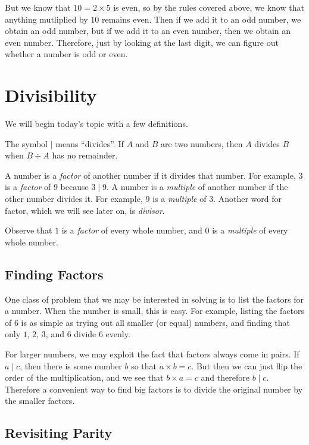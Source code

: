 \documentclass[a4paper,10pt]{report}
\begin{document}
But we know that $10=2\times5$ is even, so by the rules covered above, we know
that anything mutliplied by $10$ remains even. Then if we add it to an odd
number, we obtain an odd number, but if we add it to an even number, then we
obtain an even number. Therefore, just by looking at the last digit, we can
figure out whether a number is odd or even.

\section{Divisibility}

We will begin today's topic with a few definitions.

The symbol $\mid$ means ``divides''. If $A$ and $B$ are two numbers, then $A$
divides $B$ when $B \div A$ has no remainder.

A number is a \emph{factor} of another number if it divides that number. For
example, $3$ is a \emph{factor} of $9$ because $3 \mid 9$. A number is a
\emph{multiple} of another number if the other number divides it. For example,
$9$ is a \emph{multiple} of $3$. Another word for factor, which we will see
later on, is \emph{divisor}.

Observe that $1$ is a \emph{factor} of every whole number, and $0$ is a
\emph{multiple} of every whole number.

\subsection{Finding Factors}

One class of problem that we may be interested in solving is to list the factors
for a number. When the number is small, this is easy. For example, listing the
factors of $6$ is as simple as trying out all smaller (or equal) numbers, and
finding that only $1$, $2$, $3$, and $6$ divide $6$ evenly.

For larger numbers, we may exploit the fact that factors always come in pairs.
If $a \mid c$, then there is some number $b$ so that $a \times b = c$. But then
we can just flip the order of the multiplication, and we see that $b \times a =
c$ and therefore $b \mid c$. Therefore a convenient way to find big factors is
to divide the original number by the smaller factors.

\subsection{Revisiting Parity}
\end{document}
